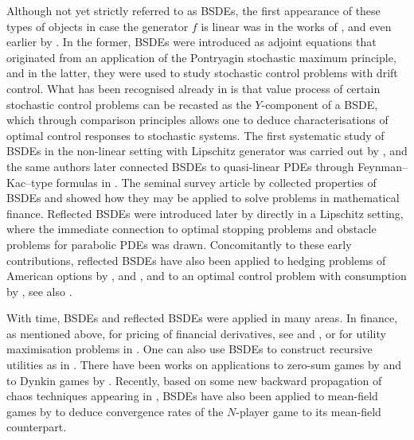 \documentclass[10pt]{article} %
\newcommand{\1}{\mathbf{1}}
\begin{document}
\medskip
Although not yet strictly referred to as BSDEs, the first appearance of these types of objects in case the generator $f$ is linear was in the works of \citeauthor*{bismut1973analyse} \cite{bismut1973analyse,bismut1973conjugate}, and even earlier by \citeauthor*{davis1973dynamic} \cite{davis1973dynamic}. In the former, BSDEs were introduced as adjoint equations that originated from an application of the Pontryagin stochastic maximum principle, and in the latter, they were used to study stochastic control problems with drift control. What has been recognised already in \cite{davis1973dynamic} is that value process of certain stochastic control problems can be recasted as the $Y$-component of a BSDE, which through comparison principles allows one to deduce characterisations of optimal control responses to stochastic systems. The first systematic study of BSDEs in the non-linear setting with Lipschitz generator was carried out by \citeauthor{pardoux1990adapted} \cite{pardoux1990adapted}, and the same authors later connected BSDEs to quasi-linear PDEs through Feynman--Kac--type formulas in \cite{pardoux1992backward}. The seminal survey article by \citeauthor*{el1997backward} \cite{el1997backward} collected properties of BSDEs and showed how they may be applied to solve problems in mathematical finance. Reflected BSDEs were introduced later by \citeauthor*{el1997reflected} \cite{el1997reflected} directly in a Lipschitz setting, where the immediate connection to optimal stopping problems and obstacle problems for parabolic PDEs was drawn. Concomitantly to these early contributions, reflected BSDEs have also been applied to hedging problems of American options by \citeauthor*{el1997non} \cite{el1997non}, and \citeauthor*{el1997reflected2} \cite{el1997reflected2}, and to an optimal control problem with consumption by \citeauthor*{el1998optimization} \cite{el1998optimization}, see also \citeauthor*{bally2002reflected} \cite{bally2002reflected}.

\medskip
With time, BSDEs and reflected BSDEs were applied in many areas. In finance, as mentioned above, for pricing of financial derivatives, see \citeauthor*{el1997backward} \cite{el1997backward} and \cite{el1997non,el1997reflected2}, or for utility maximisation problems in \citeauthor*{hu2005utility} \cite{hu2005utility}. One can also use BSDEs to construct recursive utilities as in \citeauthor*{duffie1992asset} \cite{duffie1992asset,duffie1992stochastic}. There have been works on applications to zero-sum games by \citeauthor*{hamadene1995zero} \cite{hamadene1995zero} and to Dynkin games by \citeauthor*{cvitanic1996backward} \cite{cvitanic1996backward}. Recently, based on some new backward propagation of chaos techniques appearing in \citeauthor*{lauriere2019backward} \cite{lauriere2019backward}, BSDEs have also been applied to mean-field games by \citeauthor*{possamai2021non} \cite{possamai2021non} to deduce convergence rates of the $N$-player game to its mean-field counterpart.
\end{document}
